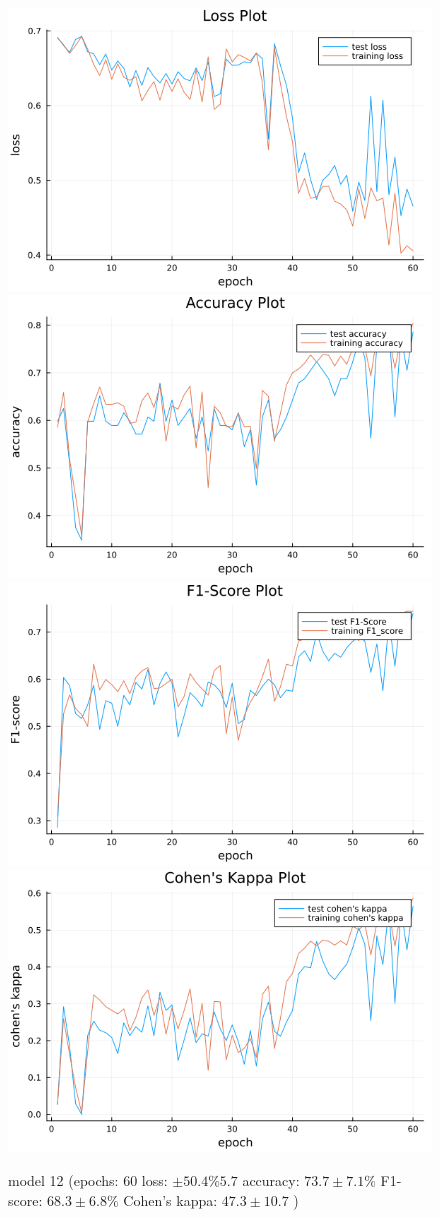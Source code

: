 \documentclass[
a4paper, 
12pt,
grayscalebody, %
abstract=on,
twoside, BCOR10mm, 12pt, DIV13,headinclude, footexclude, final, abstracton, openright
]{ibireprt}
\numberwithin{equation}{chapter}
\numberwithin{table}{chapter}
\numberwithin{figure}{chapter}
\numberwithin{algorithm}{chapter}
\numberwithin{example}{chapter}
\numberwithin{example}{chapter}
\begin{document}
\begin{figure}[h]
	\includegraphics[width=0.4\linewidth]{loss_png_12_1.png}\hfill
	\includegraphics[width=0.4\linewidth]{accuracy_png_12_1.png}
	\\[\smallskipamount]
	\includegraphics[width=0.4\linewidth]{f1_score_png_12_1.png}\hfill
	\includegraphics[width=0.4\linewidth]{cohens_kappa_png_12_1.png}
	\caption{model 12 (epochs: 60 loss: $\pm50.4\%5.7 $ accuracy: $73.7\pm7.1\%$ F1-score: $68.3\pm6.8\%$  Cohen's kappa: $47.3\pm10.7$ )}
	\label{fig:model_12_200}
\end{figure}
\end{document}
